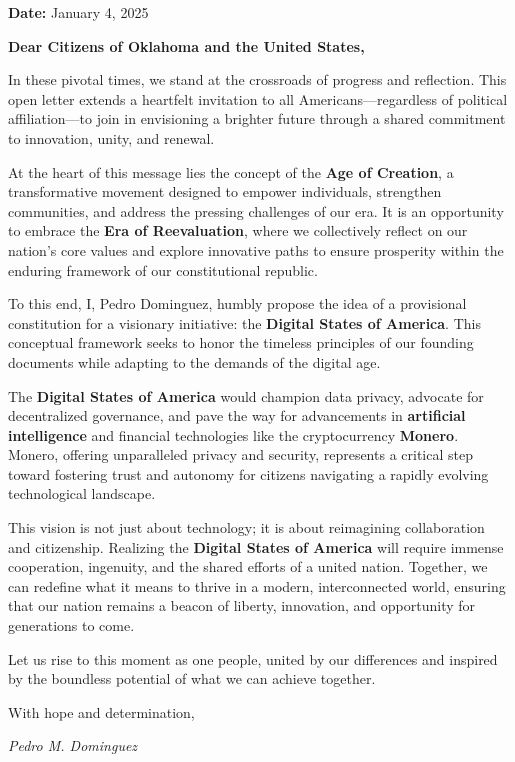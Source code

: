 \documentclass[12pt]{article}
\begin{document}
\hfill \textbf{Date:} January 4, 2025

\vspace{2em}

\begin{center}
    \Large\textbf{Dear Citizens of Oklahoma and the United States,}
\end{center}

\vspace{1em}

In these pivotal times, we stand at the crossroads of progress and reflection. This open letter extends a heartfelt invitation to all Americans—regardless of political affiliation—to join in envisioning a brighter future through a shared commitment to innovation, unity, and renewal.

At the heart of this message lies the concept of the \textbf{Age of Creation}, a transformative movement designed to empower individuals, strengthen communities, and address the pressing challenges of our era. It is an opportunity to embrace the \textbf{Era of Reevaluation}, where we collectively reflect on our nation’s core values and explore innovative paths to ensure prosperity within the enduring framework of our constitutional republic.

To this end, I, Pedro Dominguez, humbly propose the idea of a provisional constitution for a visionary initiative: the \textbf{Digital States of America}. This conceptual framework seeks to honor the timeless principles of our founding documents while adapting to the demands of the digital age.

The \textbf{Digital States of America} would champion data privacy, advocate for decentralized governance, and pave the way for advancements in \textbf{artificial intelligence} and financial technologies like the cryptocurrency \textbf{Monero}. Monero, offering unparalleled privacy and security, represents a critical step toward fostering trust and autonomy for citizens navigating a rapidly evolving technological landscape.

This vision is not just about technology; it is about reimagining collaboration and citizenship. Realizing the \textbf{Digital States of America} will require immense cooperation, ingenuity, and the shared efforts of a united nation. Together, we can redefine what it means to thrive in a modern, interconnected world, ensuring that our nation remains a beacon of liberty, innovation, and opportunity for generations to come.

\vspace{1.5em}

Let us rise to this moment as one people, united by our differences and inspired by the boundless potential of what we can achieve together.

\vspace{2em}

With hope and determination,

\vspace{2em}

\hfill \textit{\large Pedro M. Dominguez} %
\end{document}
